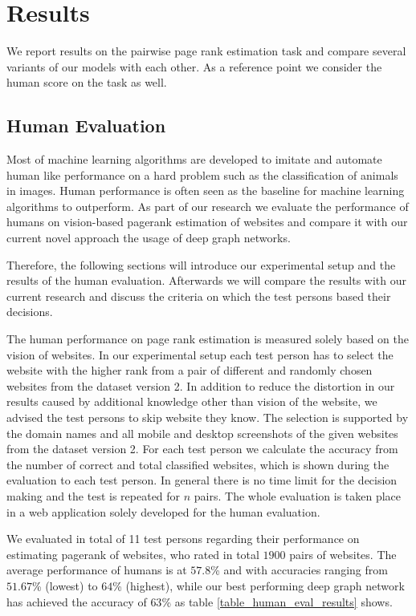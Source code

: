 \section{Results}
We report results on the pairwise page rank estimation task and compare several variants of our models with each other. As a reference point we consider the human score on the task as well.

\subsection{Human Evaluation}
Most of machine learning algorithms are developed to imitate and automate human like performance on a hard problem such as the classification of animals in images. Human performance is often seen as the baseline for machine learning algorithms to outperform. As part of our research we evaluate the performance of humans on vision-based pagerank estimation of websites and compare it with our current novel approach the usage of deep graph networks. 

Therefore, the following sections will introduce our experimental setup and the results of the human evaluation. Afterwards we will compare the results with our current research and discuss the criteria on which the test persons based their decisions.

The human performance on page rank estimation is measured solely based on the vision of websites. In our experimental setup each test person has to select the website with the higher rank from a pair of different and randomly chosen websites from the dataset version 2. In addition to reduce the distortion in our results caused by additional knowledge other than vision of the website, we advised the test persons to skip website they know. The selection is supported by the domain names and all mobile and desktop screenshots of the given websites from the dataset version 2. For each test person we calculate the accuracy from the number of correct and total classified websites, which is shown during the evaluation to each test person. In general there is no time limit for the decision making and the test is repeated for $n$ pairs. The whole evaluation is taken place in a web application solely developed for the human evaluation.

We evaluated in total of 11 test persons regarding their performance on estimating pagerank of websites, who rated in total $1900$ pairs of websites. The average performance of humans is at $57.8$\% and with accuracies ranging from $51.67$\% (lowest) to $64$\% (highest), while our best performing deep graph network has achieved the accuracy of $63$\% as table \ref{table_human_eval_results} shows.

